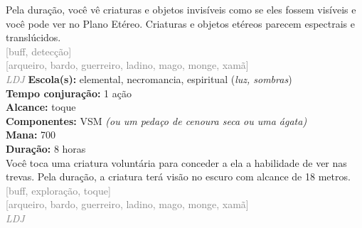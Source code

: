 \documentclass{RPG_Adventure}[2021/10/20]
\begin{document}
{\normalsize Pela duração, você vê criaturas e objetos invisíveis como se eles fossem visíveis e você pode ver no Plano Etéreo. Criaturas e objetos etéreos parecem espectrais e translúcidos.\\}
{\scriptsize \textcolor{gray}{[buff, detecção]\\}}
{\scriptsize \textcolor{gray}{[arqueiro, bardo, guerreiro, ladino, mago, monge, xamã]\\}}
{\tiny \textcolor{gray}{\textit{LDJ}}}\jump{}
{\small \t \textbf{Escola(s):} elemental, necromancia, espiritual (\textit{luz, sombras})\\\t \textbf{Tempo conjuração:} 1 ação\\\t \textbf{Alcance:} toque\\\t \textbf{Componentes:} VSM \textit{(ou um pedaço de cenoura seca ou uma ágata)}\\\t \textbf{Mana:} 700\\\t \textbf{Duração:} 8 horas\\}
{\normalsize Você toca uma criatura voluntária para conceder a ela a habilidade de ver nas trevas. Pela duração, a criatura terá visão no escuro com alcance de 18 metros.\\}
{\scriptsize \textcolor{gray}{[buff, exploração, toque]\\}}
{\scriptsize \textcolor{gray}{[arqueiro, bardo, guerreiro, ladino, mago, monge, xamã]\\}}
{\tiny \textcolor{gray}{\textit{LDJ}}}\jump

\end{document}
